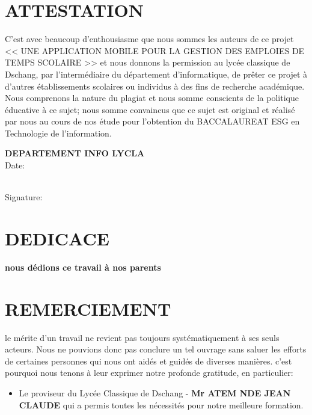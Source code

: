 \documentclass[english,12pt,a4paper]{report}
\begin{document}
\begin{spacing}{1.5}
\chapter*{ATTESTATION}
\hspace{1.2cm}
C'est avec beaucoup d'enthousiasme que nous sommes les auteurs de ce projet << UNE APPLICATION MOBILE POUR LA GESTION DES EMPLOIES DE TEMPS SCOLAIRE >> et nous donnons la permission au lycée classique de Dschang, par l'intermédiaire du département d'informatique, de prêter ce projet à d'autres établissements scolaires ou individus à des fins de recherche académique. Nous comprenons la nature du plagiat et nous somme conscients de la politique éducative à ce sujet; nous somme convaincus que ce sujet est original et réalisé par nous au cours de nos étude pour l'obtention du BACCALAUREAT ESG en Technologie de l'information.
\begin{center}
\vspace{1cm}
\vspace{0.2cm}
\textbf{DEPARTEMENT INFO LYCLA}\\
\vspace{0.2cm}
Date:
\\
\vspace{0.2cm}
Signature:
\end{center}
{}
\chapter*{DEDICACE}
\hspace{1.2cm} 
\begin{center}
	\textbf{nous dédions ce travail à nos parents}
\end{center}
\vspace{-1.5cm}
\chapter*{REMERCIEMENT}
\vspace{-1.5cm}
\hspace{1.cm}
le mérite d'un travail ne revient pas toujours systématiquement à ses seuls acteurs. Nous ne pouvions donc pas conclure un tel ouvrage sans saluer les efforts de certaines personnes qui nous ont aidés et guidés de diverses manières. c'est pourquoi nous tenons à leur exprimer notre profonde gratitude, en particulier:
\begin{itemize}[label=\textbullet, font=\LARGE %
	]
	\item Le proviseur du Lycée Classique de Dschang - \textbf{Mr ATEM NDE JEAN CLAUDE} qui a permis toutes les nécessités pour notre meilleure formation.
	

\end{itemize}
\end{spacing}
\end{document}
